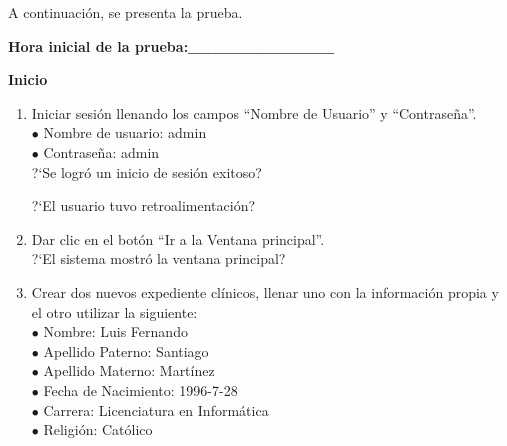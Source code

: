 A continuación, se presenta la prueba.

\textbf{Hora inicial de la prueba:\_\_\_\_\_\_\_\_\_\_\_\_}

\textbf{Inicio}

\begin{enumerate}
	\item {Iniciar sesión llenando los campos ``Nombre de Usuario'' y ``Contraseña''.\\
			$\bullet$ Nombre de usuario: admin\\
			$\bullet$ Contraseña: admin\\
			?`Se logró un inicio de sesión exitoso?
	}
	?`El usuario tuvo retroalimentación?
	\item {Dar clic en el botón ``Ir a la Ventana principal''.\\
		?`El sistema mostró la ventana principal?
	}
	\item {Crear dos nuevos expediente clínicos, llenar uno con la información propia y el otro utilizar la siguiente:\\
			$\bullet$ Nombre: Luis Fernando\\
			$\bullet$ Apellido Paterno: Santiago\\
			$\bullet$ Apellido Materno: Martínez\\
			$\bullet$ Fecha de Nacimiento: 1996-7-28\\
			$\bullet$ Carrera: Licenciatura en Informática\\
			$\bullet$ Religión: Católico\\
}
\end{enumerate}
